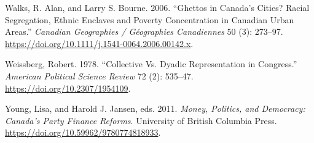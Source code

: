 \documentclass[
  letterpaper,
  DIV=11,
  numbers=noendperiod]{scrartcl}
\newlength{\cslhangindent}
\newenvironment{CSLReferences}[2] %
 {\begin{list}{}{%
  \setlength{\itemindent}{0pt}
  \setlength{\leftmargin}{0pt}
  \setlength{\parsep}{0pt}
  \ifodd #1
   \setlength{\leftmargin}{\cslhangindent}
   \setlength{\itemindent}{-1\cslhangindent}
  \fi
  \setlength{\itemsep}{#2\baselineskip}}}
 {\end{list}}
\begin{document}
\begin{CSLReferences}{1}{1}
Walks, R. Alan, and Larry S. Bourne. 2006. {``Ghettos in {Canada}'s
Cities? {Racial} Segregation, Ethnic Enclaves and Poverty Concentration
in {Canadian} Urban Areas.''} \emph{Canadian Geographies / Géographies
Canadiennes} 50 (3): 273--97.
\url{https://doi.org/10.1111/j.1541-0064.2006.00142.x}.

Weissberg, Robert. 1978. {``Collective Vs. Dyadic Representation in
Congress.''} \emph{American Political Science Review} 72 (2): 535--47.
\url{https://doi.org/10.2307/1954109}.

Young, Lisa, and Harold J. Jansen, eds. 2011. \emph{Money, {Politics},
and {Democracy}: {Canada}'s {Party} {Finance} {Reforms}}. University of
British Columbia Press. \url{https://doi.org/10.59962/9780774818933}.

\end{CSLReferences}
\end{document}
